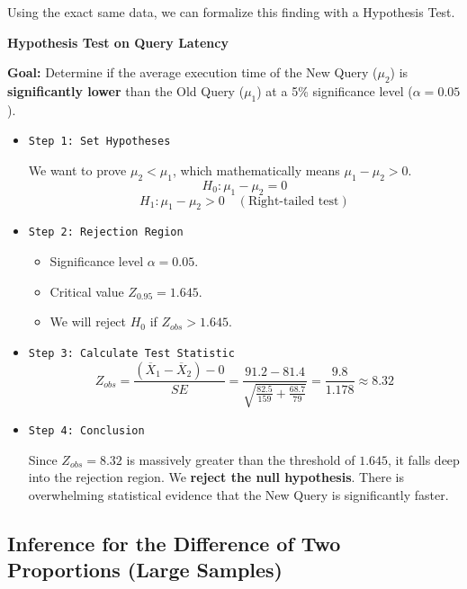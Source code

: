 \vspace{0.2cm}

Using the exact same data, we can formalize this finding with a Hypothesis Test.

\begin{example}{\textbf{Hypothesis Test on Query Latency}}

\textbf{Goal:} Determine if the average execution time of the New Query ($\mu_2$) is \textbf{significantly lower} than the Old Query ($\mu_1$) at a 5\% significance level ($\alpha = 0.05$).

\begin{itemize}
    \item \texttt{Step 1: Set Hypotheses} 
    
    We want to prove $\mu_2 < \mu_1$, which mathematically means $\mu_1 - \mu_2 > 0$.
    $$ H_0: \mu_1 - \mu_2 = 0 $$
    $$ H_1: \mu_1 - \mu_2 > 0 \quad (\text{Right-tailed test}) $$

    \item \texttt{Step 2: Rejection Region} 
    \begin{itemize}
        \item Significance level $\alpha = 0.05$.
        \item Critical value $Z_{0.95} = 1.645$.
        \item We will reject $H_0$ if $Z_{obs} > 1.645$.
    \end{itemize}

    \item \texttt{Step 3: Calculate Test Statistic} 
    $$ Z_{obs} = \frac{(\overline{X}_1 - \overline{X}_2) - 0}{SE} = \frac{91.2 - 81.4}{\sqrt{\frac{82.5}{159} + \frac{68.7}{79}}} = \frac{9.8}{1.178} \approx 8.32 $$

    \item \texttt{Step 4: Conclusion} 
    
    Since $Z_{obs} = 8.32$ is massively greater than the threshold of $1.645$, it falls deep into the rejection region. We \textbf{reject the null hypothesis}. There is overwhelming statistical evidence that the New Query is significantly faster.
\end{itemize}
\end{example}
\subsection{Inference for the Difference of Two Proportions (Large Samples)}

